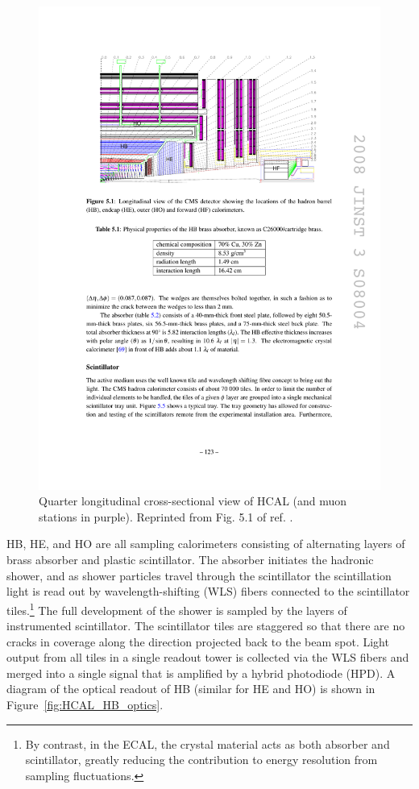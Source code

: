 \documentclass[dissertation.tex]{subfiles}
\begin{document}
\begin{figure}
	\centering
	\includegraphics[scale=1.0]{HCAL_longitudinal_xsec}
	\caption{Quarter longitudinal cross-sectional view of HCAL (and muon stations in purple).  Reprinted from Fig. 5.1 of ref. \cite{CMS_detector_paper}.}
	\label{fig:HCAL_longitudinal_xsec}
\end{figure}

HB, HE, and HO are all sampling calorimeters consisting of alternating layers of brass absorber and plastic scintillator.  The absorber initiates the hadronic shower, and as shower particles travel through the scintillator the scintillation light is read out by wavelength-shifting (WLS) fibers connected to the scintillator tiles.\footnote{By contrast, in the ECAL, the crystal material acts as both absorber and scintillator, greatly reducing the contribution to energy resolution from sampling fluctuations.}  The full development of the shower is sampled by the layers of instrumented scintillator.  The scintillator tiles are staggered so that there are no cracks in coverage along the direction projected back to the beam spot.  Light output from all tiles in a single readout tower is collected via the WLS fibers and merged into a single signal that is amplified by a hybrid photodiode (HPD).  A diagram of the optical readout of HB (similar for HE and HO) is shown in Figure~\ref{fig:HCAL_HB_optics}.
\end{document}
